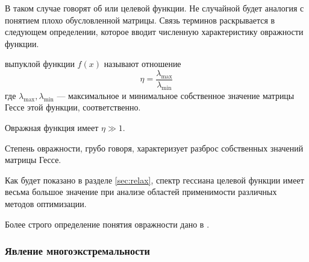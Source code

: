 В таком случае говорят об  или  целевой функции. Не случайной будет аналогия с
понятием плохо обусловленной матрицы. Связь терминов раскрывается в
следующем определении, которое вводит численную характеристику
овражности функции.

\begin{dfn}
  \label{dfn:ill-cond}
   выпуклой функции $f(x)$ называют
  отношение
  \begin{equation*}
    \eta = \frac{\lambda_{\max}}{\lambda_{\min}}
  \end{equation*}
  где $\lambda_{\max}, \lambda_{\min}$ — максимальное и минимальное
  собственное значение матрицы Гессе этой функции, соответственно.
\end{dfn}

Овражная функция имеет $\eta \gg 1$.

Степень овражности, грубо говоря, характеризует разброс собственных
значений матрицы Гессе. 

Как будет показано в разделе \ref{sec:relax}, спектр гессиана целевой
функции имеет весьма большое значение при анализе областей
применимости различных методов оптимизации.

Более строго определение понятия овражности дано в
\cite{chernorutsky04}.

\subsubsection{Явление многоэкстремальности}
